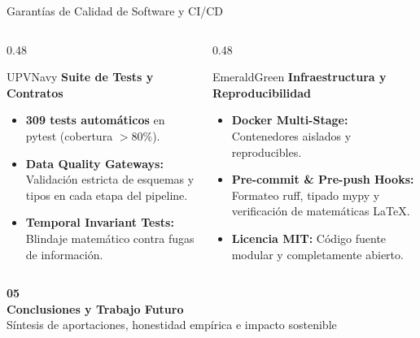 \documentclass[aspectratio=169, 10pt]{beamer}
\begin{document}
\begin{frame}{Garantías de Calidad de Software y CI/CD}
  \begin{columns}[T]
    \begin{column}{0.48\textwidth}
      \begin{metriccard}{UPVNavy}
        \textbf{\textcolor{UPVNavy}{Suite de Tests y Contratos}}
        \begin{itemize}\small
          \item \textbf{309 tests automáticos} en pytest (cobertura $>80\%$).
          \item \textbf{Data Quality Gateways:} Validación estricta de esquemas y tipos en cada etapa del pipeline.
          \item \textbf{Temporal Invariant Tests:} Blindaje matemático contra fugas de información.
        \end{itemize}
      \end{metriccard}
    \end{column}
    \begin{column}{0.48\textwidth}
      \begin{metriccard}{EmeraldGreen}
        \textbf{\textcolor{EmeraldGreen}{Infraestructura y Reproducibilidad}}
        \begin{itemize}\small
          \item \textbf{Docker Multi-Stage:} Contenedores aislados y reproducibles.
          \item \textbf{Pre-commit \& Pre-push Hooks:} Formateo ruff, tipado mypy y verificación de matemáticas LaTeX.
          \item \textbf{Licencia MIT:} Código fuente modular y completamente abierto.
        \end{itemize}
      \end{metriccard}
    \end{column}
  \end{columns}
\end{frame}

\begin{frame}[standout]
  \Huge \textbf{05} \\[0.4cm]
  \Large \textbf{Conclusiones y Trabajo Futuro} \\[0.2cm]
  \normalsize Síntesis de aportaciones, honestidad empírica e impacto sostenible
\end{frame}
\end{document}
